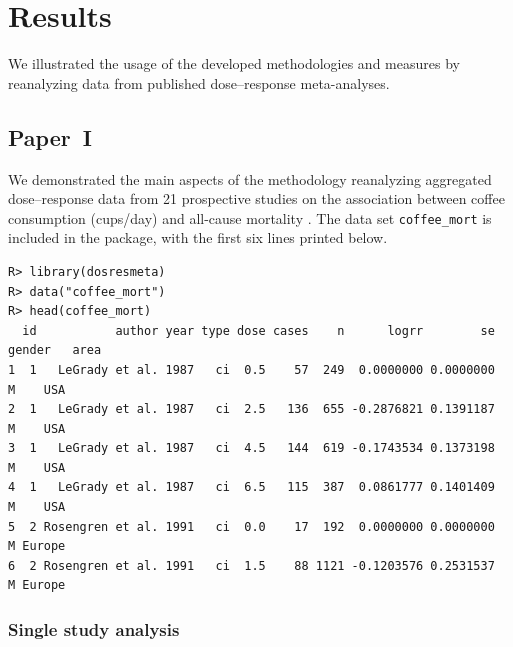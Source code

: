 \documentclass[11pt,a4paper,twoside,openany]{book}\usepackage{knitr}
\begin{document}
{{%

%

\chapter{Results}

We illustrated the usage of the developed methodologies and measures by reanalyzing data from published dose--response meta-analyses. 

\section{Paper~I}\label{sec:res_paperI}

We demonstrated the main aspects of the methodology reanalyzing aggregated dose--response data from 21 prospective studies on the association between coffee consumption (cups/day) and all-cause mortality \citep{crippa2014coffee}. The data set \texttt{coffee\_mort} is included in the package, with the first six lines printed below.

\begin{knitrout}\footnotesize
{}\color{fgcolor}\begin{kframe}
\begin{verbatim}
R> library(dosresmeta)
R> data("coffee_mort")
R> head(coffee_mort)
  id           author year type dose cases    n      logrr        se gender   area
1  1   LeGrady et al. 1987   ci  0.5    57  249  0.0000000 0.0000000      M    USA
2  1   LeGrady et al. 1987   ci  2.5   136  655 -0.2876821 0.1391187      M    USA
3  1   LeGrady et al. 1987   ci  4.5   144  619 -0.1743534 0.1373198      M    USA
4  1   LeGrady et al. 1987   ci  6.5   115  387  0.0861777 0.1401409      M    USA
5  2 Rosengren et al. 1991   ci  0.0    17  192  0.0000000 0.0000000      M Europe
6  2 Rosengren et al. 1991   ci  1.5    88 1121 -0.1203576 0.2531537      M Europe
\end{verbatim}
\end{kframe}
\end{knitrout}

\subsection{Single study analysis}

}}
\end{document}
